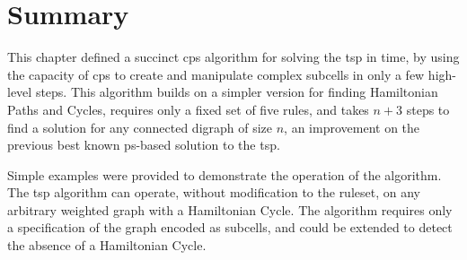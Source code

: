 \section{\label{sec:tsp:conc}Summary}
This chapter defined a succinct \gls{cps} algorithm for solving the \gls{tsp} in  time, by using the capacity of \gls{cps} to create and manipulate complex subcells in only a few high-level steps.  This algorithm builds on a simpler version for finding Hamiltonian Paths and Cycles, requires only a fixed set of five rules, and takes \(n + 3\) steps to find a solution for any connected digraph of size \(n\), an improvement on the previous best known \gls{ps}-based solution to the \gls{tsp}.%

Simple examples were provided to demonstrate the operation of the algorithm.  The \gls{tsp} algorithm can operate, without modification to the ruleset, on any arbitrary weighted graph with a Hamiltonian Cycle.   The algorithm requires only a specification of the graph encoded as subcells, and could be extended to detect the absence of a Hamiltonian Cycle.



